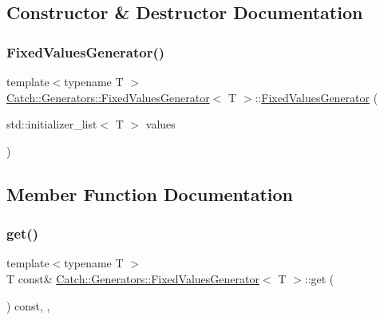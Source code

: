 \subsection{Constructor \& Destructor Documentation}
\mbox{\label{class_catch_1_1_generators_1_1_fixed_values_generator_a6e9f473655413c1cb15f079890f06b86}} 
\subsubsection{\texorpdfstring{Fixed\+Values\+Generator()}{FixedValuesGenerator()}}
{\footnotesize\ttfamily template$<$typename T $>$ \\
\mbox{\hyperlink{class_catch_1_1_generators_1_1_fixed_values_generator}{Catch\+::\+Generators\+::\+Fixed\+Values\+Generator}}$<$ T $>$\+::\mbox{\hyperlink{class_catch_1_1_generators_1_1_fixed_values_generator}{Fixed\+Values\+Generator}} (\begin{DoxyParamCaption}\item[{std\+::initializer\+\_\+list$<$ T $>$}]{values }\end{DoxyParamCaption})\hspace{0.3cm}{\ttfamily [inline]}}



\subsection{Member Function Documentation}
\mbox{\label{class_catch_1_1_generators_1_1_fixed_values_generator_ad2ea8c959c600386bcc4b2656b40d33e}} 
\subsubsection{\texorpdfstring{get()}{get()}}
{\footnotesize\ttfamily template$<$typename T $>$ \\
T const\& \mbox{\hyperlink{class_catch_1_1_generators_1_1_fixed_values_generator}{Catch\+::\+Generators\+::\+Fixed\+Values\+Generator}}$<$ T $>$\+::get (\begin{DoxyParamCaption}{ }\end{DoxyParamCaption}) const\hspace{0.3cm}{\ttfamily [inline]}, {\ttfamily [override]}, {\ttfamily [virtual]}}



